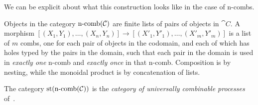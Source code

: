 We can be explicit about what this construction looks like in the case of
n-combs.

\begin{dfn}
  Objects in the category $\operatorname*{n-comb}({\mathcal{C}})$ are finite lists of pairs of objects
  in $\cat{C}$. A morphism $[(X_1, Y_1), \ldots, (X_n, Y_n)]\to [(X'_1, Y'_1),
  \dots, (X'_m, Y'_m)]$ is a list of $m$ combs, one for each pair of objects in
  the codomain, and each of which has holes typed by the pairs in the domain,
  such that each pair in the domain is used in \emph{exactly one} n-comb and
  \emph{exactly once} in that n-comb. Composition is by nesting, while the
  monoidal product is by concatenation of lists.
\end{dfn}

\begin{ex}
  The category $\operatorname*{st}(\operatorname*{n-comb}({\mathcal{C}}))$ is the \emph{category of universally
  combinable processes} of~\cite{coecke-2016}.
\end{ex}

